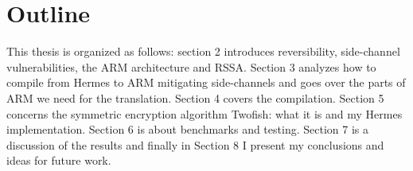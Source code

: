 \section{Outline}
This thesis is organized as follows: section 2 introduces reversibility, side-channel vulnerabilities, the ARM architecture and RSSA. Section 3 analyzes how to compile from Hermes to ARM mitigating side-channels and goes over the parts of ARM we need for the translation. Section 4 covers the compilation. Section 5 concerns the symmetric encryption algorithm Twofish: what it is and my Hermes implementation. Section 6 is about benchmarks and testing. Section 7 is a discussion of the results and finally in Section 8 I present my conclusions and ideas for future work.
